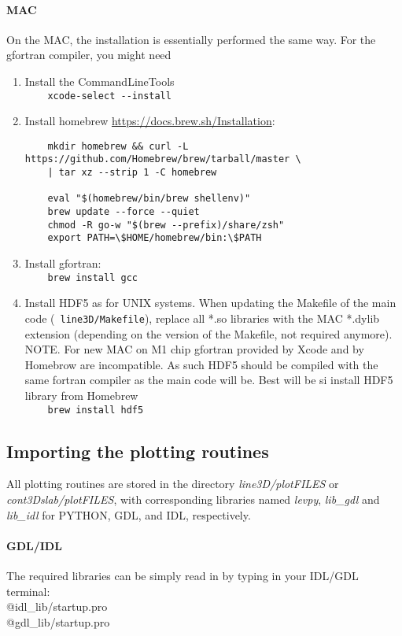 \documentclass[10pt,a4paper]{article}
\begin{document}
\paragraph{MAC}
On the MAC, the installation is essentially performed the same way. For the gfortran compiler, you might need
\begin{enumerate}
\item Install the CommandLineTools \\
  \verb|    xcode-select --install|
\item Install homebrew \href{https://docs.brew.sh/Installation}{https://docs.brew.sh/Installation}:\\
  \begin{verbatim}
    mkdir homebrew && curl -L https://github.com/Homebrew/brew/tarball/master \
    | tar xz --strip 1 -C homebrew 

    eval "$(homebrew/bin/brew shellenv)"
    brew update --force --quiet
    chmod -R go-w "$(brew --prefix)/share/zsh"
    export PATH=\$HOME/homebrew/bin:\$PATH
  \end{verbatim}
\item Install gfortran:\\
  \verb|    brew install gcc|
\item Install HDF5 as for UNIX systems. When updating the Makefile of
  the main code (\eg~\verb|line3D/Makefile|), replace all *.so libraries with
  the MAC *.dylib extension (depending on the version of the Makefile, not required anymore).\\
  {\color{red} NOTE. For new MAC on M1 chip gfortran provided by Xcode and by Homebrow are incompatible.
  As such HDF5 should be compiled with the same fortran compiler as the main code will be.
  Best will be si install HDF5 library from Homebrew 
  \\
  \verb|    brew install hdf5|}
\end{enumerate}

\subsection{Importing the plotting routines}
All plotting routines are stored in the directory
\textit{line3D/plotFILES} or \textit{cont3Dslab/plotFILES}, with
corresponding libraries named \textit{levpy}, \textit{lib\_gdl} and
\textit{lib\_idl} for \textsc{PYTHON}, \textsc{GDL}, and \textsc{IDL},
respectively.
%
\paragraph{GDL/IDL}
The required libraries can be simply read in by typing in your IDL/GDL terminal:\\
@idl\_lib/startup.pro \\
@gdl\_lib/startup.pro \\
\end{document}
